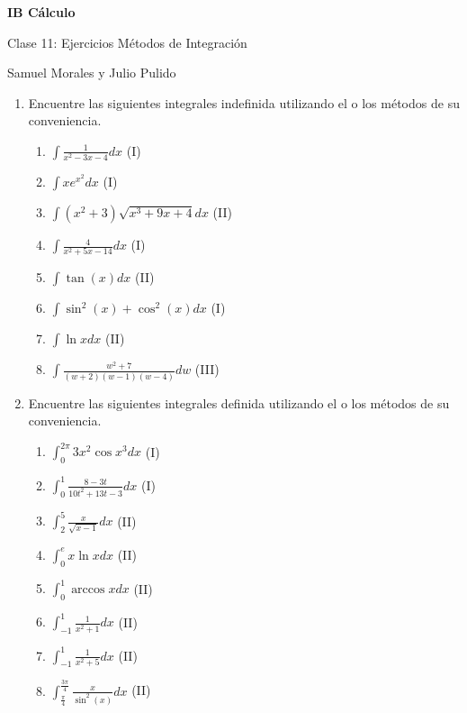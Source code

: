 \documentclass[spanish,12pt]{article}
\begin{document}
	\begin{titlepage}
	\begin{center}
	\hspace{0pt}
	\vfill
	{\Large\textbf{{IB Cálculo}}}
	
	\medskip
	Clase 11: Ejercicios Métodos de Integración
	
	\medskip
    Samuel Morales y Julio Pulido
	
	\thispagestyle{empty}
	\vfill
	\end{center}
	\end{titlepage}
\begin{enumerate}[1)]
    \item Encuentre las siguientes integrales indefinida utilizando el o los métodos de su conveniencia.
    \begin{enumerate}
        \item $\int \frac{1}{x^2-3x-4}dx$ (I)
        \item $\int xe^{x^2}dx$ (I)
        \item $\int (x^2+3)\sqrt{x^3+9x+4}dx$ (II)
        \item $\int \frac{4}{x^2+5x-14}dx$ (I)
        \item $\int \tan(x)dx$ (II)
        \item $\int \sin^2(x)+\cos^2(x)dx $ (I)
        \item $\int \ln{x}dx$ (II)
        \item $\int \frac{w^2+7}{(w+2)(w-1)(w-4)}dw$ (III)
    \end{enumerate}
    \item Encuentre las siguientes integrales definida utilizando el o los métodos de su conveniencia.
    \begin{enumerate}
        \item $\int_{0}^{2\pi} 3x^2\cos{x^3}dx$ (I)
        \item $\int_{0}^{1} \frac{8-3t}{10t^2+13t-3}dx$ (I)
        \item $\int_2^{5} \frac{x}{\sqrt{x-1}}dx$ (II)
        \item $\int_0^e x\ln{x}dx$ (II)
        \item $\int_0^1 \arccos{x}dx$ (II)
        \item $\int_{-1}^{1} \frac{1}{x^2+1}dx$ (II)
        \item $\int_{-1}^{1} \frac{1}{x^2+5}dx$ (II)
        \item $\int_{\frac{\pi}{4}}^{\frac{3\pi}{4}} \frac{x}{\sin^2(x)}dx$ (II)
    

\end{enumerate}
\end{enumerate}
\end{document}
